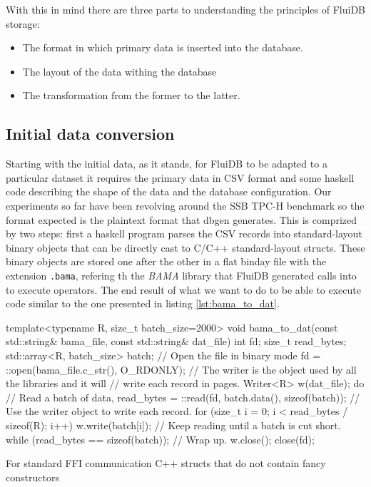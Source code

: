 With this in mind there are three parts to understanding the
principles of FluiDB storage:

\begin{itemize}
\item The format in which primary data is inserted into the database.
\item The layout of the data withing the database
\item The transformation from the former to the latter.
\end{itemize}

\subsection{Initial data conversion}

Starting with the initial data, as it stands, for FluiDB to be adapted
to a particular dataset it requires the primary data in CSV format and
some haskell code describing the shape of the data and the database
configuration. Our experiments so far have been revolving around the
SSB TPC-H benchmark so the format expected is the plaintext format
that dbgen \cite{perivolaropoulosFakedrakeSsbdbgen2021} generates. This
is comprized by two steps: first a haskell program parses the CSV
records into standard-layout binary objects that can be directly cast
to C/C++ standard-layout structs. These binary objects are stored one
after the other in a flat binday file with the extension \texttt{.bama},
refering th the \emph{BAMA} library that FluiDB generated calls into to
execute operators. The end result of what we want to do to be able to
execute code similar to the one presented in listing
\ref{lst:bama_to_dat}.

\begin{code}
\begin{cppcode}
template<typename R, size_t batch_size=2000>
void bama_to_dat(const std::string& bama_file, const std::string& dat_file) {
  int fd;
  size_t read_bytes;
  std::array<R, batch_size> batch;
  // Open the file in binary mode
  fd = ::open(bama_file.c_str(), O_RDONLY);
  // The writer is the object used by all the libraries and it will
  // write each record in pages.
  Writer<R> w(dat_file);
  do {
    // Read a batch of data,
    read_bytes = ::read(fd, batch.data(), sizeof(batch));
    // Use the writer object to write each record.
    for (size_t i = 0; i < read_bytes / sizeof(R); i++) {
      w.write(batch[i]);
    }
    // Keep reading until a batch is cut short.
  } while (read_bytes == sizeof(batch));
  // Wrap up.
  w.close();
  close(fd);
}
\end{cppcode}
  \caption{\label{lst:bama_to_dat}For standard FFI communication C++
    structs that do not contain fancy constructors}
\end{code}

